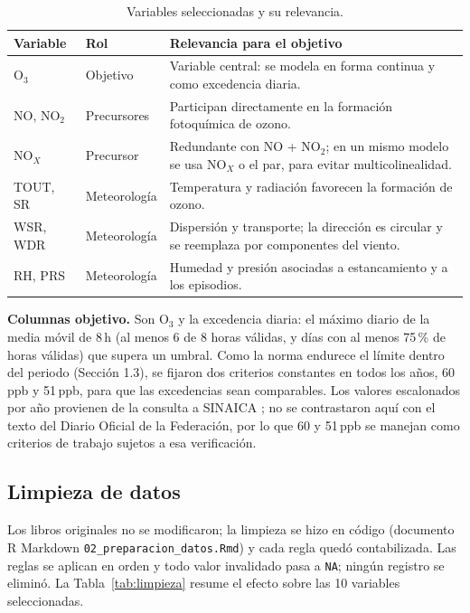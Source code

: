 \documentclass[11pt,letterpaper]{article}
\begin{document}
\begin{table}[h]
\centering
\small
\renewcommand{\arraystretch}{1.1}
\begin{tabular}{@{}p{2.3cm}p{2.4cm}p{9.3cm}@{}}
\toprule
Variable & Rol & Relevancia para el objetivo \\
\midrule
O$_3$ & Objetivo & Variable central: se modela en forma continua y como excedencia diaria. \\
NO, NO$_2$ & Precursores & Participan directamente en la formaci\'on fotoqu\'imica de ozono. \\
NO$_X$ & Precursor & Redundante con NO + NO$_2$; en un mismo modelo se usa NO$_X$ o el par, para evitar multicolinealidad. \\
TOUT, SR & Meteorolog\'ia & Temperatura y radiaci\'on favorecen la formaci\'on de ozono. \\
WSR, WDR & Meteorolog\'ia & Dispersi\'on y transporte; la direcci\'on es circular y se reemplaza por componentes del viento. \\
RH, PRS & Meteorolog\'ia & Humedad y presi\'on asociadas a estancamiento y a los episodios. \\
\bottomrule
\end{tabular}
\caption{Variables seleccionadas y su relevancia.}
\label{tab:seleccion}
\end{table}

\textbf{Columnas objetivo.} Son O$_3$ y la excedencia diaria: el m\'aximo diario de la media m\'ovil de 8\,h (al menos 6 de 8 horas v\'alidas, y d\'ias con al menos 75\,\% de horas v\'alidas) que supera un umbral. Como la norma endurece el l\'imite dentro del periodo (Secci\'on 1.3), se fijaron dos criterios constantes en todos los a\~nos, 60\,ppb y 51\,ppb, para que las excedencias sean comparables. Los valores escalonados por a\~no provienen de la consulta a SINAICA \cite{sinaica}; no se contrastaron aqu\'i con el texto del Diario Oficial de la Federaci\'on, por lo que 60 y 51\,ppb se manejan como criterios de trabajo sujetos a esa verificaci\'on.

\subsection{Limpieza de datos}
Los libros originales no se modificaron; la limpieza se hizo en c\'odigo (documento R Markdown \texttt{02\_preparacion\_}\allowbreak\texttt{datos.Rmd}) y cada regla qued\'o contabilizada. Las reglas se aplican en orden y todo valor invalidado pasa a \texttt{NA}; ning\'un registro se elimin\'o. La Tabla~\ref{tab:limpieza} resume el efecto sobre las 10 variables seleccionadas.
\end{document}
